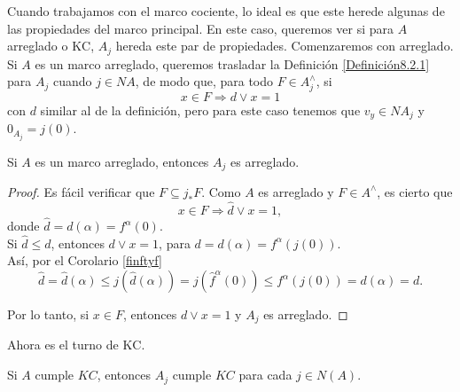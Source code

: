 Cuando trabajamos con el marco cociente, lo ideal es que este herede algunas de las propiedades del marco principal. En este caso, queremos ver si para $A$ arreglado o $\mathrm{KC}$, $A_j$ hereda este par de 
propiedades. Comenzaremos con arreglado.\\

Si $A$ es un marco arreglado, queremos trasladar la Definición \ref{Definición8.2.1} para $A_j$ cuando $j\in NA$, de modo que, para todo $F\in A_j^\wedge$, si
\[
x\in F \Rightarrow d\vee x=1
\]
con $d$ similar al de la definición, pero para este caso tenemos que $v_y\in NA_j$ y $0_{A_j}=j(0)$.

\begin{prop}\label{tidyquout}
    Si $A$ es un marco arreglado, entonces $A_j$ es arreglado.
\end{prop}

\begin{proof}
Es fácil verificar que $F\subseteq j_*F$. Como $A$ es arreglado y $F\in A^\wedge$, es cierto que 
\[
x\in F\Rightarrow \hat{d}\vee x=1,
\]
donde $\hat{d}=d(\alpha)=f^\alpha(0)$.\\
Si $\hat{d}\leq d$, entonces $d\vee x=1$, para $d=d(\alpha)=f^\alpha(j(0))$.\\

Así, por el Corolario \ref{finftyf}
\[
\hat{d}=\hat{d}(\alpha)\leq j(\hat{d}(\alpha))=j(\hat{f}^\alpha(0))\leq f^\alpha(j(0))=d(\alpha)=d.
\]

Por lo tanto, si $x\in F$, entonces $d\vee x=1$ y $A_j$ es arreglado.
\end{proof}

Ahora es el turno de $\mathrm{KC}$.
\begin{prop}\label{KCquout}
    Si $A$ cumple $KC$, entonces $A_j$ cumple $KC$ para cada $j\in N(A).$
\end{prop}

